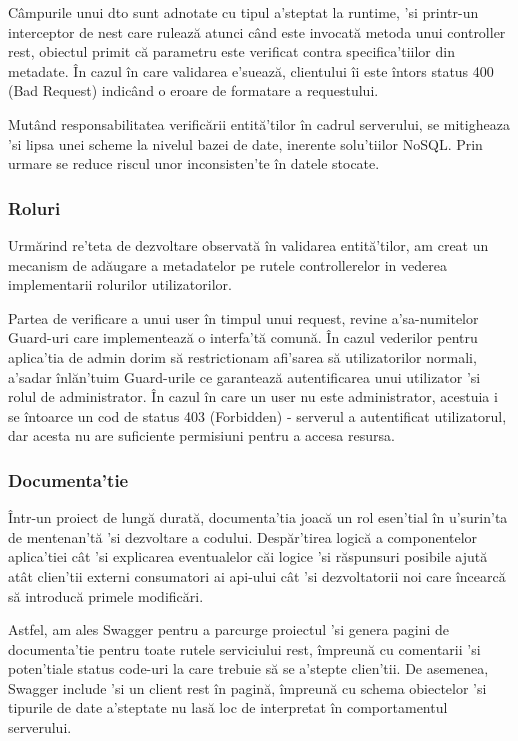 Câmpurile unui \acrfull{dto} sunt adnotate cu tipul a'steptat la runtime, 'si printr-un interceptor de nest care rulează atunci când este invocată metoda unui controller \acrshort{rest}, obiectul primit că parametru este verificat contra specifica'tiilor din metadate. În cazul în care validarea e'suează, clientului îi este întors status 400 (Bad Request) indicând o eroare de formatare a requestului.

Mutând responsabilitatea verificării entită'tilor în cadrul serverului, se mitigheaza 'si lipsa unei scheme la nivelul bazei de date, inerente solu'tiilor NoSQL. Prin urmare se reduce riscul unor inconsisten'te în datele stocate.

\subsubsection {Roluri}

Urmărind re'teta de dezvoltare observată în validarea entită'tilor, am creat un mecanism de adăugare a metadatelor pe rutele controllerelor in vederea implementarii rolurilor utilizatorilor.

Partea de verificare a unui user în timpul unui request, revine a'sa-numitelor Guard-uri care implementează o interfa'tă comună. În cazul vederilor pentru aplica'tia de admin dorim să restrictionam afi'sarea să utilizatorilor normali, a'sadar înlăn'tuim Guard-urile ce garantează autentificarea unui utilizator 'si rolul de administrator. În cazul în care un user nu este administrator, acestuia i se întoarce un cod de status 403 (Forbidden) - serverul a autentificat utilizatorul, dar acesta nu are suficiente permisiuni pentru a accesa resursa.

\subsubsection {Documenta'tie}

Într-un proiect de lungă durată, documenta'tia joacă un rol esen'tial în u'surin'ta de mentenan'tă 'si dezvoltare a codului. Despăr'tirea logică a componentelor aplica'tiei cât 'si explicarea eventualelor căi logice 'si răspunsuri posibile ajută atât clien'tii externi consumatori ai \acrshort{api}-ului cât 'si dezvoltatorii noi care încearcă să introducă primele modificări.

Astfel, am ales Swagger pentru a parcurge proiectul 'si genera pagini de documenta'tie pentru toate rutele serviciului \acrshort{rest}, împreună cu comentarii 'si poten'tiale status code-uri la care trebuie să se a'stepte clien'tii. De asemenea, Swagger include 'si un client \acrshort{rest} în pagină, împreună cu schema obiectelor 'si tipurile de date a'steptate nu lasă loc de interpretat în comportamentul serverului.

